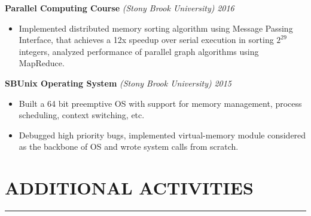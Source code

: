 \documentclass[12pt]{article}
\newcommand{\sectionHeading}[1]{
\vspace{-15pt}
\section*{\small{#1}}
\vspace{-10pt}
\hrule
\vspace{8pt}
}
\newcommand {\projectSectionSubheading}[4]{
    \noindent \small{\textbf{#1} \textit{(#2)} : #3  \hfill \textit{#4}} \\
    \vspace{-10pt}
}
\newcommand {\projectSectionSubheadingAlternate}[3]{
    \noindent \small{\textbf{#1} \textit{(#2)} \hfill \textit{#3}} \\
    \vspace{-22pt}
}
\newcommand {\extracurricularSectionSubheading}[3]{
    \noindent \small{\textbf{#1} : #2 \hfill \textit{#3}} \\
    \vspace{-10pt}
}
\newcommand{\sectionListStart}{
    \begin{itemize}[label={\small{\textbullet}}, leftmargin=20pt] %
}
\newcommand{\sectionListEnd}{\end{itemize} \vspace{-5pt}}
\newcommand{\sectionListItem}[1]{\item \small{#1}}
\begin{document}
\projectSectionSubheadingAlternate{Parallel Computing Course}{Stony Brook University}{2016}
\sectionListStart
    \sectionListItem
        Implemented distributed memory sorting algorithm using Message Passing Interface, that achieves a 12x speedup over serial execution in sorting $2^{29}$ integers, analyzed performance of parallel graph algorithms using MapReduce.
\sectionListEnd

\projectSectionSubheadingAlternate{SBUnix Operating System}{Stony Brook University}{2015}
\sectionListStart
    \sectionListItem
        Built a 64 bit preemptive OS with support for memory management, process scheduling, context switching, etc. 
    \sectionListItem    
        Debugged high priority bugs, implemented virtual-memory module considered as the backbone of OS and wrote system calls from scratch. 
\sectionListEnd






\sectionHeading{ADDITIONAL ACTIVITIES}

\end{document}
